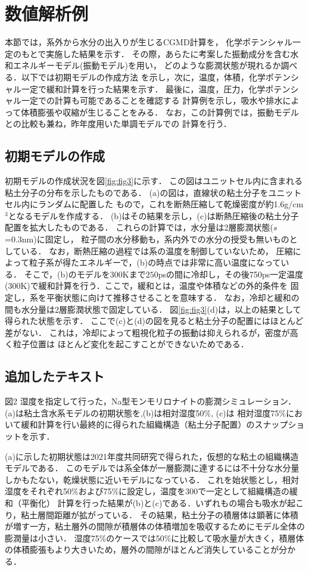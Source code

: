 \section{数値解析例}
本節では，系外から水分の出入りが生じるCGMD計算を，
化学ポテンシャル一定のもとで実施した結果を示す．
その際，あらたに考案した振動成分を含む水和エネルギーモデル(振動モデル)を用い，
どのような膨潤状態が現れるか調べる．以下では初期モデルの作成方法
を示し，次に，温度，体積，化学ポテンシャル一定で緩和計算を行った結果を示す．
最後に，温度，圧力，化学ポテンシャル一定での計算も可能であることを確認する
計算例を示し，吸水や排水によって体積膨張や収縮が生じることをみる．
なお，この計算例では，振動モデルとの比較も兼ね，昨年度用いた単調モデルでの
計算を行う．
\subsection{初期モデルの作成}
初期モデルの作成状況を図\ref{fig:fig3}に示す．
この図はユニットセル内に含まれる粘土分子の分布を示したものである．
(a)の図は，直線状の粘土分子をユニットセル内にランダムに配置した
もので，これを断熱圧縮して乾燥密度が約1.6g/cm$^{3}$となるモデルを作成する．
(b)はその結果を示し，(c)は断熱圧縮後の粘土分子配置を拡大したものである．
これらの計算では，水分量は2層膨潤状態($s$=0.3nm)に固定し，
粒子間の水分移動も，系内外での水分の授受も無いものとしている．
なお，断熱圧縮の過程では系の温度を制御していないため，
圧縮によって粒子系が得たエネルギーで，(b)の時点では非常に高い温度になっている．
そこで，(b)のモデルを300Kまで$250$psの間に冷却し，その後750ps一定温度
(300K)で緩和計算を行う．ここで，緩和とは，温度や体積などの外的条件を
固定し，系を平衡状態に向けて推移させることを意味する．
なお，冷却と緩和の間も水分量は2層膨潤状態で固定している．
図\ref{fig:fig3}(d)は，以上の結果として得られた状態を示す．
ここで(c)と(d)の図を見ると粘土分子の配置にはほとんど差がない．
これは，冷却によって粗視化粒子の振動は抑えられるが，密度が高く粒子位置は
ほとんど変化を起こすことができないためである．
\subsection{追加したテキスト}
図2
湿度を指定して行った，Na型モンモリロナイトの膨潤シミュレーション．(a)は粘土含水系モデルの初期状態を,(b)は相対湿度50$\%$, 
(c)は 相対湿度75$\%$において緩和計算を行い最終的に得られた組織構造（粘土分子配置）のスナップショットを示す．

(a)に示した初期状態は2021年度共同研究で得られた，仮想的な粘土の組織構造モデルである．
このモデルでは系全体が一層膨潤に達するには不十分な水分量しかもたない，乾燥状態に近いモデルになっている．
これを始状態とし，相対湿度をそれぞれ50$\%$および75$\%$に設定し，温度を300で一定として組織構造の緩和（平衡化）
計算を行った結果が(b)と(c)である．いずれもの場合も吸水が起こり，粘土層間距離が拡がっている．
その結果，粘土分子の積層体は顕著に体積が増す一方，粘土層外の間隙が積層体の体積増加を吸収するためにモデル全体の膨潤量は小さい．
湿度75$\%$のケースでは50$\%$に比較して吸水量が大きく，積層体の体積膨張もより大きいため，層外の間隙がほとんど消失していることが分かる．

